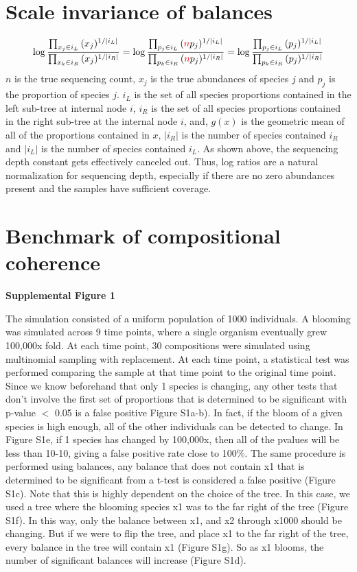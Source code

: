 \section{Scale invariance of balances}
\begin{align}
\log \frac{\prod_{x_j \in i_L}{(x_j)^{1/|i_L|}}}{\prod_{x_k \in i_R}{(x_j)^{1/|i_R|}}} =
\log \frac{\prod_{p_j \in i_L}{(\textcolor{red}{n}p_j)^{1/|i_L|}}}{\prod_{p_k \in i_R}{(\textcolor{red}{n}p_j)^{1/|i_R|}}}=
\log \frac{\prod_{p_j \in i_L}{(p_j)^{1/|i_L|}}}{\prod_{p_k \in i_R}{(p_j)^{1/|i_R|}}}
\end{align}
$n$  is the true sequencing count, $x_j$ is the true abundances of species $j$ and $p_j$ is the proportion of species $j$. $i_L$ is the set of all species proportions contained in the left sub-tree at internal node $i$, $i_R$ is the set of all species proportions contained in the right sub-tree at the internal node $i$, and, $g(x)$ is the geometric mean of all of the proportions contained in $x$, $|i_R|$ is the number of species contained  $i_R$ and  $|i_L|$ is the number of species contained  $i_L$.  As shown above, the sequencing depth constant gets effectively canceled out.  Thus, log ratios are a natural normalization for sequencing depth, especially if there are no zero abundances present and the samples have sufficient coverage.

%
\section{Benchmark of compositional coherence}
\textbf{Supplemental Figure 1}

The simulation consisted of a uniform population of 1000 individuals.  A blooming was simulated across 9 time points, where a single organism eventually grew 100,000x fold.  At each time point, 30 compositions were simulated using multinomial sampling with replacement.  At each time point, a statistical test was performed comparing the sample at that time point to the original time point.  Since we know beforehand that only 1 species is changing, any other tests that don’t involve the first set of proportions that is determined to be significant with p-value $<$ 0.05 is a false positive Figure S1a-b).  In fact, if the bloom of a given species is high enough, all of the other individuals can be detected to change.  In Figure S1e, if 1 species has changed by 100,000x, then all of the pvalues will be less than 10-10, giving a false positive rate close to 100\%.  The same procedure is performed using balances, any balance that does not contain x1 that is determined to be significant from a t-test is considered a false positive (Figure S1c).  Note that this is highly dependent on the choice of the tree.  In this case, we used a tree where the blooming species x1 was to the far right of the tree (Figure S1f).  In this way, only the balance between x1, and x2 through x1000 should be changing.  But if we were to flip the tree, and place x1 to the far right of the tree, every balance in the tree will contain x1 (Figure S1g).  So as x1 blooms, the number of significant balances will increase (Figure S1d).

